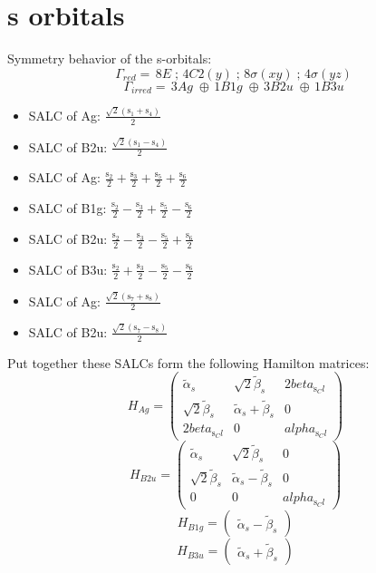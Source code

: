 \documentclass[12pt,a4paper]{article}
\begin{document}
\newpage \section*{s orbitals}
Symmetry behavior of the s-orbitals:
$$\mathsf{\Gamma}_{red} = \,8 E\;; \,4 C2(y)\;; \,8 \sigma (xy)\;; \,4 \sigma (yz)\;$$
$$\mathsf{\Gamma}_{irred} = \,3 Ag\;\oplus{}\,1 B1g\;\oplus{}\,3 B2u\;\oplus{}\,1 B3u\;$$


\begin{itemize}
\item SALC of Ag: \quad $\frac{\sqrt{2} \left(\text{s}_{1} + \text{s}_{4}\right)}{2}$
\item SALC of B2u: \quad $\frac{\sqrt{2} \left(\text{s}_{1} - \text{s}_{4}\right)}{2}$
\item SALC of Ag: \quad $\frac{\text{s}_{2}}{2} + \frac{\text{s}_{3}}{2} + \frac{\text{s}_{5}}{2} + \frac{\text{s}_{6}}{2}$
\item SALC of B1g: \quad $\frac{\text{s}_{2}}{2} - \frac{\text{s}_{3}}{2} + \frac{\text{s}_{5}}{2} - \frac{\text{s}_{6}}{2}$
\item SALC of B2u: \quad $\frac{\text{s}_{2}}{2} - \frac{\text{s}_{3}}{2} - \frac{\text{s}_{5}}{2} + \frac{\text{s}_{6}}{2}$
\item SALC of B3u: \quad $\frac{\text{s}_{2}}{2} + \frac{\text{s}_{3}}{2} - \frac{\text{s}_{5}}{2} - \frac{\text{s}_{6}}{2}$
\item SALC of Ag: \quad $\frac{\sqrt{2} \left(\text{s}_{7} + \text{s}_{8}\right)}{2}$
\item SALC of B2u: \quad $\frac{\sqrt{2} \left(\text{s}_{7} - \text{s}_{8}\right)}{2}$
\end{itemize}
Put together these SALCs form the following Hamilton matrices:
     $$ H_{Ag}= \begin{pmatrix}\tilde{\alpha}_{s} & \sqrt{2} \tilde{\beta}_{s} & 2 beta_{\text{s}_Cl}\\\sqrt{2} \tilde{\beta}_{s} & \tilde{\alpha}_{s} + \tilde{\beta}_{s} & 0\\2 beta_{\text{s}_Cl} & 0 & alpha_{\text{s}_Cl}\end{pmatrix}$$ 
     $$ H_{B2u}= \begin{pmatrix}\tilde{\alpha}_{s} & \sqrt{2} \tilde{\beta}_{s} & 0\\\sqrt{2} \tilde{\beta}_{s} & \tilde{\alpha}_{s} - \tilde{\beta}_{s} & 0\\0 & 0 & alpha_{\text{s}_Cl}\end{pmatrix}$$ 
     $$ H_{B1g}= \begin{pmatrix}\tilde{\alpha}_{s} - \tilde{\beta}_{s}\end{pmatrix}$$ 
     $$ H_{B3u}= \begin{pmatrix}\tilde{\alpha}_{s} + \tilde{\beta}_{s}\end{pmatrix}$$ 
\end{document}
